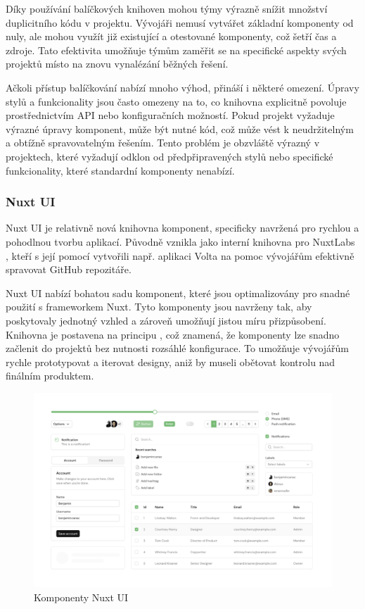 Díky používání balíčkových knihoven mohou týmy výrazně snížit množství duplicitního kódu v projektu. Vývojáři nemusí vytvářet základní komponenty od nuly, ale mohou využít již existující a otestované komponenty, což šetří čas a zdroje. Tato efektivita umožňuje týmům zaměřit se na specifické aspekty svých projektů místo na znovu vynalézání běžných řešení.

Ačkoli přístup balíčkování nabízí mnoho výhod, přináší i některé omezení. Úpravy stylů a funkcionality jsou často omezeny na to, co knihovna explicitně povoluje prostřednictvím API nebo konfiguračních možností. Pokud projekt vyžaduje výrazné úpravy komponent, může být nutné  kód, což může vést k neudržitelným a obtížně spravovatelným řešením. Tento problém je obzvláště výrazný v projektech, které vyžadují odklon od předpřipravených stylů nebo specifické funkcionality, které standardní komponenty nenabízí.

\subsubsection{Nuxt UI}
Nuxt UI je relativně nová knihovna komponent, specificky navržená pro rychlou a pohodlnou tvorbu aplikací. Původně vznikla jako interní knihovna pro NuxtLabs \cite{NuxtLabs}, kteří s její pomocí vytvořili např. aplikaci Volta na pomoc vývojářům efektivně spravovat GitHub repozitáře. \cite{Volta}

Nuxt UI nabízí bohatou sadu komponent, které jsou optimalizovány pro snadné použití s frameworkem Nuxt. Tyto komponenty jsou navrženy tak, aby poskytovaly jednotný vzhled a zároveň umožňují jistou míru přizpůsobení. Knihovna je postavena na principu , což znamená, že komponenty lze snadno začlenit do projektů bez nutnosti rozsáhlé konfigurace. To umožňuje vývojářům rychle prototypovat a iterovat designy, aniž by museli obětovat kontrolu nad finálním produktem.

\begin{figure}[H]
    \includegraphics[width=\textwidth]{images/nuxt-ui}
    \caption{Komponenty Nuxt UI} \label{picture:nuxt-ui}
\end{figure}

